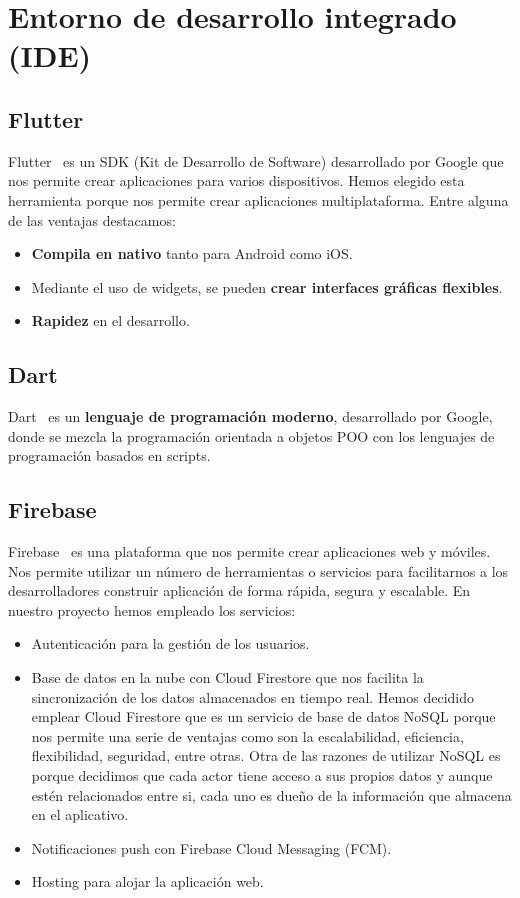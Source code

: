 \section{Entorno de desarrollo integrado (IDE)}
\subsection{Flutter}
Flutter~\cite{flutter} es un SDK (Kit de Desarrollo de Software) desarrollado por Google que nos permite crear aplicaciones para varios dispositivos. Hemos elegido esta herramienta porque nos permite crear aplicaciones multiplataforma.
Entre alguna de las ventajas destacamos:
\begin{itemize}
\item \textbf{Compila en nativo} tanto para Android como iOS.
\item Mediante el uso de widgets, se pueden \textbf{crear interfaces gráficas flexibles}.
\item \textbf{Rapidez} en el desarrollo.
\end{itemize}

\subsection{Dart}
Dart~\cite{dart} es un \textbf{lenguaje de programación moderno}, desarrollado por Google, donde se mezcla la programación orientada a objetos POO con los lenguajes de programación basados en scripts.

\subsection{Firebase}
Firebase~\cite{firebase} es una plataforma que nos permite crear aplicaciones web y móviles. Nos permite utilizar un número de herramientas o servicios para facilitarnos a los desarrolladores construir aplicación de forma rápida, segura y escalable. En nuestro proyecto hemos empleado los servicios:
\begin{itemize}
\item Autenticación para la gestión de los usuarios.
\item Base de datos en la nube con Cloud Firestore que nos facilita la sincronización de los datos almacenados en tiempo real. Hemos decidido emplear Cloud Firestore que es un servicio de base de datos NoSQL porque nos permite una serie de ventajas como son la escalabilidad, eficiencia, flexibilidad, seguridad, entre otras. Otra de las razones de utilizar NoSQL es porque decidimos que cada actor tiene acceso a sus propios datos y aunque estén relacionados entre si, cada uno es dueño de la información que almacena en el aplicativo.
\item Notificaciones push con Firebase Cloud Messaging (FCM).
\item Hosting para alojar la aplicación web.
\end{itemize}

